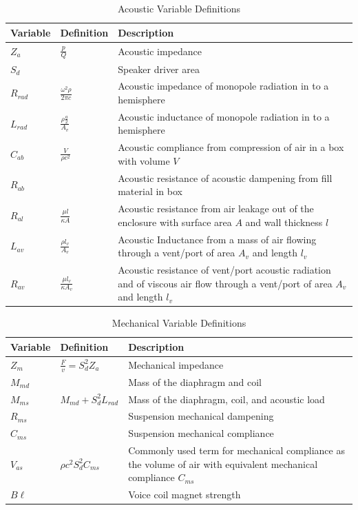 \documentclass[10pt]{book}
\begin{document}
\begin{table}
\centering
\renewcommand{\arraystretch}{1.5}
\begin{tabularx}{\textwidth}{@{} ll X @{}}
\toprule
Variable & Definition & Description \\
\midrule
$Z_a$ & $\frac{p}{Q}$ & Acoustic impedance\\
$S_d$ & & Speaker driver area\\
$R_{rad}$ & $\frac{\omega^2 \rho}{2\pi c}$ & Acoustic impedance of monopole radiation in to a hemisphere\\
$L_{rad}$ & $\frac{\rho \frac{a}{2}}{A_v}$ & Acoustic inductance of monopole radiation in to a hemisphere\\
$C_{ab}$ & $\frac{V}{\rho c^2}$ & Acoustic compliance from compression of air in a box with volume $V$\\
$R_{ab}$ & & Acoustic resistance of acoustic dampening from fill material in box\\
$R_{al}$ & $\frac{\mu l}{\kappa A}$ & Acoustic resistance from air leakage out of the enclosure with surface area $A$ and wall thickness $l$\\
$L_{av}$ & $\frac{\rho l_v}{A_v}$ & Acoustic Inductance from a mass of air flowing through a vent/port of area $A_v$ and length $l_v$\\
$R_{av}$ & $\frac{\mu l_v}{\kappa A_v}$ & Acoustic resistance of vent/port acoustic radiation and of viscous air flow through a vent/port of area $A_v$ and length $l_v$\\
\bottomrule
\end{tabularx}
\caption{Acoustic Variable Definitions}\label{table:acoustic-variables}
\end{table}

\begin{table}
\centering
\renewcommand{\arraystretch}{1.5}
\begin{tabularx}{\textwidth}{@{} ll X @{}}
\toprule
Variable & Definition & Description \\
\midrule
$Z_m$ & $\frac{F}{v}=S_d^2 Z_a$ & Mechanical impedance\\
$M_{md}$ & & Mass of the diaphragm and coil\\
$M_{ms}$ &$M_{md}+S_d^2L_{rad}$ & Mass of the diaphragm, coil, and acoustic load\\
$R_{ms}$ & & Suspension mechanical dampening\\
$C_{ms}$ &  & Suspension mechanical compliance\\
$V_{as}$ & $\rho c^2 S_d^2 C_{ms}$  & Commonly used term for mechanical compliance as the volume of air with equivalent mechanical compliance $C_{ms}$\\
$B\ell$ & & Voice coil magnet strength \\
\bottomrule
\end{tabularx}
\caption{Mechanical Variable Definitions}\label{table:mech-variables}
\end{table}
\end{document}
